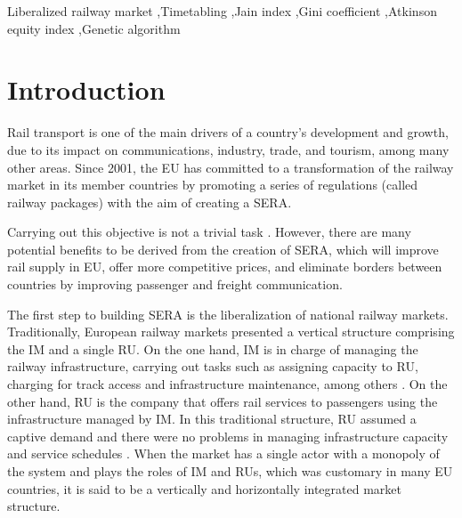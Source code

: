 \documentclass[preprint,12pt]{elsarticle}
\begin{document}
\begin{frontmatter}


\begin{keyword}
Liberalized railway market \sep Timetabling \sep Jain index \sep Gini coefficient \sep Atkinson equity index \sep Genetic algorithm


\end{keyword}


\end{frontmatter}

\section{Introduction}
Rail transport is one of the main drivers of a country's development and growth, due to its impact on communications, industry, trade, and tourism, among many other areas. Since 2001, the \gls{EU} has committed to a transformation of the railway market in its member countries by promoting a series of regulations (called railway packages) with the aim of creating a \gls{SERA}\cite{COM2011}.

Carrying out this objective is not a trivial task \cite{Ait2021, Yao2024Bi-objectiveLine}. However, there are many potential benefits to be derived from the creation of \gls{SERA}, which will improve rail supply in \gls{EU}, offer more competitive prices, and eliminate borders between countries by improving passenger and freight communication.

The first step to building \gls{SERA} is the liberalization of national railway markets. Traditionally, European railway markets presented a vertical structure comprising the \gls{IM} and a single \gls{RU}. On the one hand, \gls{IM} is in charge of managing the railway infrastructure, carrying out tasks such as assigning capacity to \gls{RU}, charging for track access and infrastructure maintenance, among others \cite{Pena2015}. On the other hand, \gls{RU} is the company that offers rail services to passengers using the infrastructure managed by \gls{IM}. In this traditional structure, \gls{RU} assumed a captive demand and there were no problems in managing infrastructure capacity and service schedules \cite{Besinovic2024}. When the market has a single actor with a monopoly of the system and plays the roles of \gls{IM} and \glspl{RU}, which was customary in many \gls{EU} countries, it is said to be a vertically and horizontally integrated market structure.
\end{document}
